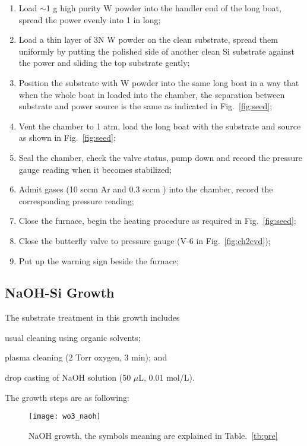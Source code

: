 \begin{enumerate}
\item Load $\sim$1 g high purity W powder into the handler end of the long boat, spread the power evenly into 1 in long;  
\item Load a thin layer of 3N W powder on the clean substrate, spread them uniformly by putting the polished side of another clean Si substrate against the power and sliding the top substrate gently; 
\item Position the substrate with W powder into the same long boat in a way that when the whole boat in loaded into the chamber, the separation between substrate and power source is the same as indicated in Fig.~\ref{fig:seed};
\item Vent the chamber to 1 atm, load the long boat with the substrate and source as shown in Fig.~\ref{fig:seed};
\item Seal the chamber, check the valve status, pump down and record the pressure gauge reading when it becomes stabilized; 
\item Admit gases (10 sccm Ar and 0.3 sccm ) into the chamber, record the corresponding pressure reading;
\item Close the furnace, begin the heating procedure as required in Fig.~\ref{fig:seed}; 
\item Close the butterfly valve to pressure gauge (V-6 in Fig.~\ref{fig:ch2cvd});
\item Put up the warning sign beside the furnace;
\end{enumerate}

\subsection{NaOH-Si Growth}

The substrate treatment in this growth includes \begin{enumerate*}[label=\itshape\alph*\upshape)]
\item usual cleaning using organic solvents;
\item plasma cleaning (2 Torr oxygen, 3 min); and
\item drop casting of NaOH solution (50 $\mu$L, 0.01 mol/L).
\end{enumerate*} The growth steps are as following: 

\begin{figure}[htb]
\centering
\texttt{[image: wo3\_naoh]}
\caption{NaOH  growth, the symbols meaning are explained in Table.~\ref{tb:pre}}
\label{fig:naw}
\end{figure}


